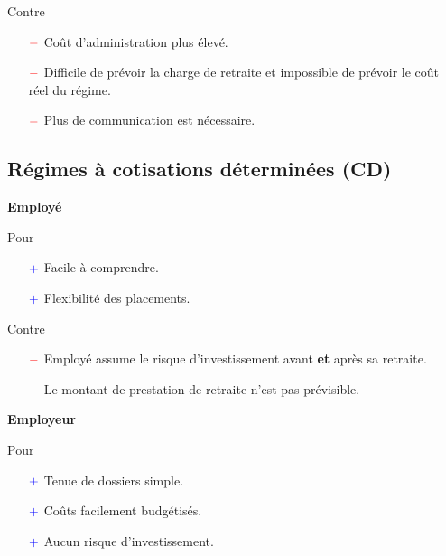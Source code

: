 \documentclass[10pt, french]{article}
\begin{document}
\begin{multicols*}{3}
Contre
\begin{itemize}
	\item[$\color{red}-$]	Coût d'administration plus élevé.
	\item[$\color{red}-$]	Difficile de prévoir la charge de retraite et impossible de prévoir le coût réel du régime.
	\item[$\color{red}-$]	Plus de communication est nécessaire.
\end{itemize}

\subsection*{Régimes à cotisations déterminées (CD)}
\begin{center}
	\textbf{Employé}
\end{center}
Pour
\begin{itemize}
	\item[$\color{blue}+$]	Facile à comprendre.
	\item[$\color{blue}+$]	Flexibilité des placements.
\end{itemize}


Contre
\begin{itemize}
	\item[$\color{red}-$]	Employé assume le risque d'investissement avant \textbf{et} après sa retraite.
	\item[$\color{red}-$]	Le montant de prestation de retraite n'est pas prévisible.
\end{itemize}

\begin{center}
	\textbf{Employeur}
\end{center}
Pour
\begin{itemize}
	\item[$\color{blue}+$]	Tenue de dossiers simple.
	\item[$\color{blue}+$]	Coûts facilement budgétisés.
	\item[$\color{blue}+$]	Aucun risque d'investissement.
\end{itemize}


\end{multicols*}
\end{document}

